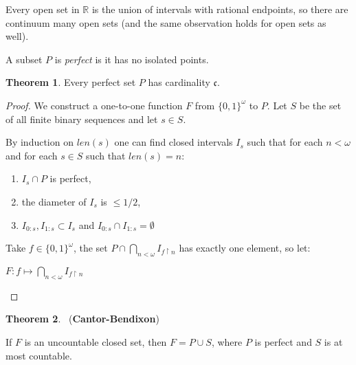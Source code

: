 \documentclass[8pt]{article}
\theoremstyle{definition}
\theoremstyle{definition}
\newtheorem{theorem}{Theorem}[section]
\theoremstyle{definition}
\theoremstyle{definition}
\theoremstyle{definition}
\theoremstyle{definition}
\theoremstyle{definition}
\theoremstyle{definition}
\theoremstyle{definition}
\theoremstyle{definition}
\theoremstyle{definition}
\theoremstyle{definition}
\theoremstyle{definition}
\theoremstyle{definition}
\theoremstyle{question}
\begin{document}
Every open set in $\mathbb{R}$ is the union of intervals with rational endpoints, so there are continuum many open sets 
(and the same observation holds for open sets as well).

A subset $P$ is \emph{perfect} is it has no isolated points.

\begin{theorem}
  Every perfect set $P$ has cardinality $\mathfrak{c}$.
\end{theorem}

\begin{proof}
  We construct a one-to-one function $F$ from $\{ 0, 1\}^{\omega}$ to $P$. 
  Let $S$ be the set of all finite binary sequences and let $s \in S$.
  
  By induction on $len(s)$ one can find closed intervals $I_s$ 
  such that for each $n < \omega$ and for each $s \in S$ such that $len(s) = n$:
  \begin{enumerate}
    \item $I_s \cap P$ is perfect,
    \item the diameter of $I_s$ is $\leq 1/2$,
    \item $I_{0:s}, I_{1:s} \subset I_s$ and $I_{0:s} \cap I_{1:s} = \emptyset$
  \end{enumerate}

  Take $f \in \{ 0, 1\}^{\omega}$, the set $P \cap \bigcap \limits_{n < \omega} I_{f \upharpoonright n}$ has exactly one element, so let:
  \begin{center}
    $F : f \mapsto \bigcap \limits_{n < \omega} I_{f \upharpoonright n}$
  \end{center}
\end{proof}

\begin{theorem}~\label{cantor-bendixon} ({\bf Cantor-Bendixon})

 If $F$ is an uncountable closed set, then $F = P \cup S$, where $P$ is perfect and $S$ is at most countable.

\end{theorem}
\end{document}
